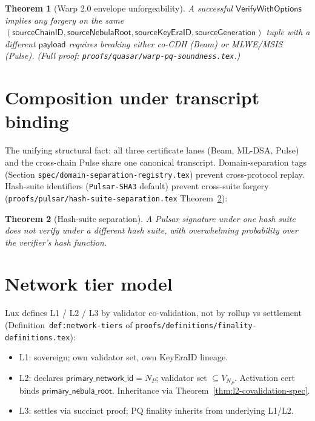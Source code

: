 \documentclass[11pt,a4paper]{article}
\newtheorem{theorem}{Theorem}
\begin{document}
\begin{theorem}[Warp 2.0 envelope unforgeability]
A successful $\mathsf{VerifyWithOptions}$ implies any forgery on the same $(\mathsf{sourceChainID}, \mathsf{sourceNebulaRoot}, \mathsf{sourceKeyEraID}, \mathsf{sourceGeneration})$ tuple with a different $\mathsf{payload}$ requires breaking either co-CDH (Beam) or MLWE/MSIS (Pulse). (Full proof: \texttt{proofs/quasar/warp-pq-soundness.tex}.)
\end{theorem}

\section{Composition under transcript binding}
\label{sec:spec-composition}

The unifying structural fact: all three certificate lanes (Beam, ML-DSA, Pulse) and the cross-chain Pulse share one canonical transcript. Domain-separation tags (Section \texttt{spec/domain-separation-registry.tex}) prevent cross-protocol replay. Hash-suite identifiers (\texttt{Pulsar-SHA3} default) prevent cross-suite forgery (\texttt{proofs/pulsar/hash-suite-separation.tex} Theorem~\ref{thm:hash-suite-separation-spec}):

\begin{theorem}[Hash-suite separation]
\label{thm:hash-suite-separation-spec}
A Pulsar signature under one hash suite does not verify under a different hash suite, with overwhelming probability over the verifier's hash function.
\end{theorem}

\section{Network tier model}

Lux defines L1 / L2 / L3 by validator co-validation, not by rollup vs settlement (Definition~\texttt{def:network-tiers} of \texttt{proofs/definitions/finality-definitions.tex}):

\begin{itemize}[leftmargin=2em,nosep]
  \item L1: sovereign; own validator set, own KeyEraID lineage.
  \item L2: declares $\mathsf{primary\_network\_id} = N_P$; validator set $\subseteq V_{N_P}$. Activation cert binds $\mathsf{primary\_nebula\_root}$. Inheritance via Theorem~\ref{thm:l2-covalidation-spec}.
  \item L3: settles via succinct proof; PQ finality inherits from underlying L1/L2.
\end{itemize}
\end{document}

